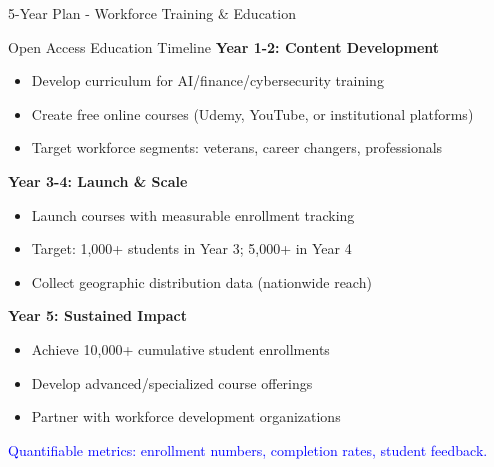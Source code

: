 \documentclass[11pt]{beamer}
\begin{document}
	\begin{frame}{5-Year Plan - Workforce Training \& Education}
		\scriptsize
		\begin{block}{Open Access Education Timeline}
			\textbf{Year 1-2: Content Development}
			\begin{itemize}
				\item Develop curriculum for AI/finance/cybersecurity training
				\item Create free online courses (Udemy, YouTube, or institutional platforms)
				\item Target workforce segments: veterans, career changers, professionals
			\end{itemize}
			\textbf{Year 3-4: Launch \& Scale}
			\begin{itemize}
				\item Launch courses with measurable enrollment tracking
				\item Target: 1,000+ students in Year 3; 5,000+ in Year 4
				\item Collect geographic distribution data (nationwide reach)
			\end{itemize}
			\textbf{Year 5: Sustained Impact}
			\begin{itemize}
				\item Achieve 10,000+ cumulative student enrollments
				\item Develop advanced/specialized course offerings
				\item Partner with workforce development organizations
			\end{itemize}
			\textcolor{blue}{Quantifiable metrics: enrollment numbers, completion rates, student feedback.}
		\end{block}
	\end{frame}
	
\end{document}
